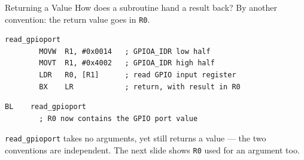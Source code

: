 \documentclass[9pt,aspectratio=169,xcolor=table]{beamer}
\begin{document}
\begin{frame}[fragile]{Returning a Value}
	\leavevmode
	{\small How does a subroutine hand a result back? By another
	convention: the return value goes in \alert{\texttt{R0}}.}

	\vspace{2mm}
	\begin{lstlisting}[style=armasm, language=ARM, basicstyle=\small\ttfamily]
read_gpioport
		MOVW  R1, #0x0014   ; GPIOA_IDR low half
		MOVT  R1, #0x4002   ; GPIOA_IDR high half
		LDR   R0, [R1]      ; read GPIO input register
		BX    LR            ; return, with result in R0
	\end{lstlisting}

	\vspace{2mm}
	\begin{lstlisting}[style=armasm, language=ARM, basicstyle=\small\ttfamily]
		BL    read_gpioport
		; R0 now contains the GPIO port value
	\end{lstlisting}

	\vspace{2mm}
	{\small \texttt{read\_gpioport} takes no arguments, yet still returns a
	value --- the two conventions are independent. The next slide shows
	\texttt{R0} used for an argument \alert{too}.}
\end{frame}
\end{document}
